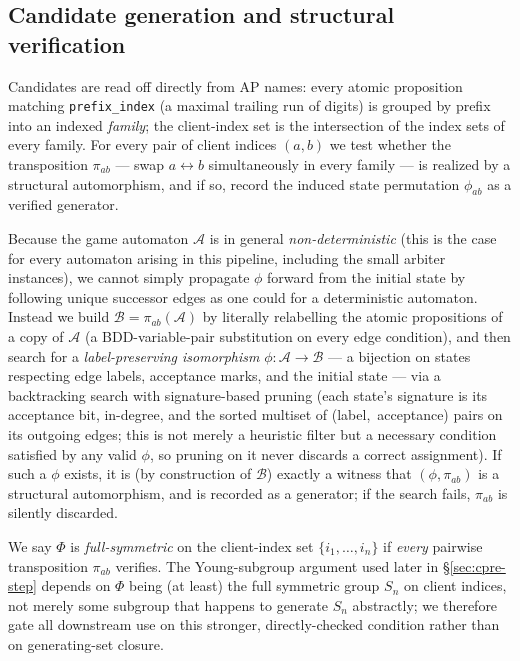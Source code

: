 \documentclass[11pt]{article}
\newcommand{\Aut}{\mathcal{A}}
\newcommand{\Phigroup}{\Phi}
\begin{document}
\subsection{Candidate generation and structural verification}

Candidates are read off directly from AP names: every atomic proposition
matching \texttt{prefix\_index} (a maximal trailing run of digits) is
grouped by prefix into an indexed \emph{family}; the client-index set is
the intersection of the index sets of every family. For every pair of
client indices $(a,b)$ we test whether the transposition $\pi_{ab}$ ---
swap $a \leftrightarrow b$ simultaneously in every family --- is realized
by a structural automorphism, and if so, record the induced state
permutation $\phi_{ab}$ as a verified generator.

Because the game automaton $\Aut$ is in general \emph{non-deterministic}
(this is the case for every automaton arising in this pipeline, including
the small arbiter instances), we cannot simply propagate $\phi$ forward
from the initial state by following unique successor edges as one could
for a deterministic automaton. Instead we build $\mathcal B = \pi_{ab}(\Aut)$
by literally relabelling the atomic propositions of a copy of $\Aut$ (a
BDD-variable-pair substitution on every edge condition), and then search
for a \emph{label-preserving isomorphism} $\phi : \Aut \to \mathcal B$ ---
a bijection on states respecting edge labels, acceptance marks, and the
initial state --- via a backtracking search with signature-based pruning
(each state's signature is its acceptance bit, in-degree, and the sorted
multiset of (label,~acceptance) pairs on its outgoing edges; this is not
merely a heuristic filter but a necessary condition satisfied by any valid
$\phi$, so pruning on it never discards a correct assignment). If such a
$\phi$ exists, it is (by construction of $\mathcal B$) exactly a witness
that $(\phi,\pi_{ab})$ is a structural automorphism, and is recorded as a
generator; if the search fails, $\pi_{ab}$ is silently discarded.

We say $\Phigroup$ is \emph{full-symmetric} on the client-index set
$\{i_1,\dots,i_n\}$ if \emph{every} pairwise transposition $\pi_{ab}$
verifies. The Young-subgroup argument used later in
\S\ref{sec:cpre-step} depends on $\Phigroup$ being (at least) the full
symmetric group $S_n$ on client indices, not merely some subgroup that
happens to generate $S_n$ abstractly; we therefore gate all downstream use
on this stronger, directly-checked condition rather than on generating-set
closure.
\end{document}
